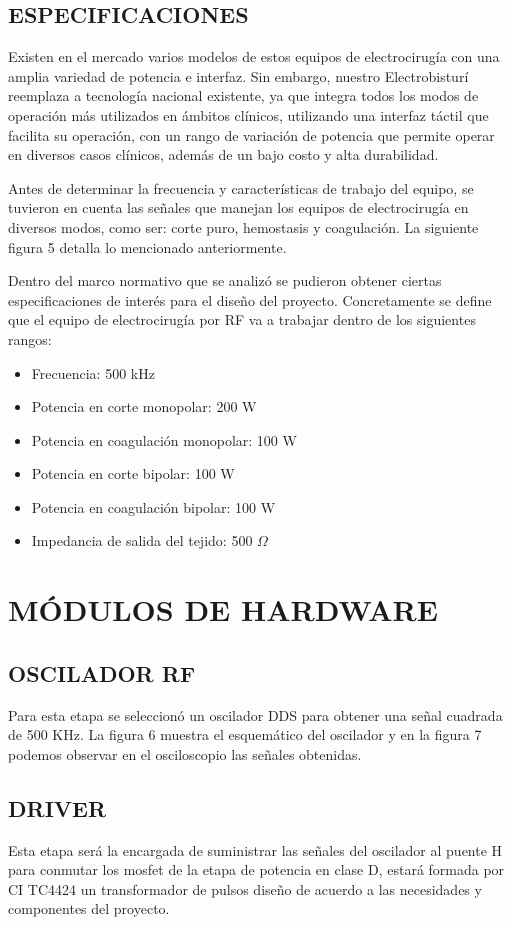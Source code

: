 \documentclass[10pt, conference, final, twocolumn, sansserif]{IEEEtran}
\begin{document}
\subsection{ESPECIFICACIONES}
Existen en el mercado varios modelos de estos equipos de electrocirugía con una amplia variedad de potencia e interfaz. Sin embargo, nuestro Electrobisturí reemplaza a tecnología nacional existente, ya que integra todos los modos de operación más utilizados en ámbitos clínicos, utilizando una interfaz táctil que facilita su operación, con un rango de variación de potencia que permite operar en diversos casos clínicos,  además de un bajo costo y alta durabilidad. 

Antes de determinar la frecuencia y características de trabajo del equipo, se tuvieron en cuenta las señales que manejan los equipos de electrocirugía en diversos modos, como ser: corte puro, hemostasis y coagulación. La siguiente figura 5 detalla lo mencionado anteriormente.

Dentro del marco normativo que se analizó se pudieron
obtener ciertas especificaciones de interés para el diseño del proyecto. Concretamente se define que el equipo de electrocirugía por RF va a trabajar dentro de los siguientes rangos:

\begin{itemize}
    \item Frecuencia: 500 kHz
    \item Potencia en corte monopolar: 200 W
    \item Potencia en coagulación monopolar: 100 W
    \item Potencia en corte bipolar: 100  W
    \item Potencia en coagulación bipolar: 100  W
    \item Impedancia de salida del tejido: 500 $\Omega$
\end{itemize}

\section{MÓDULOS DE HARDWARE}
\subsection{OSCILADOR RF}
Para esta etapa se seleccionó un oscilador DDS para obtener una señal cuadrada de 500 KHz. La figura 6 muestra el esquemático del oscilador y en la figura 7 podemos observar en el osciloscopio las señales obtenidas.

\subsection{DRIVER}
Esta etapa será la encargada de suministrar las señales del oscilador al puente H para conmutar los mosfet de la etapa de potencia en clase D, estará formada por CI TC4424  un transformador de pulsos diseño de acuerdo a las necesidades y componentes del proyecto.
\end{document}
